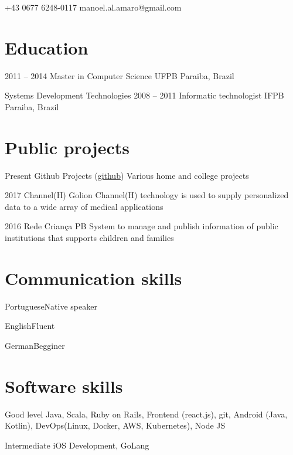\documentclass{tccv}
\begin{document}
    {+43 0677 6248-0117}
    {manoel.al.amaro@gmail.com}

\section{Education}

\begin{yearlist}

\item{2011 -- 2014}
     {Master in Computer Science}
     {UFPB Paraiba, Brazil}

\item[Systems Development Technologies]{2008 -- 2011}
     {Informatic technologist}
     {IFPB Paraiba, Brazil}

\end{yearlist}

\section{Public projects}

\begin{yearlist}

\item{Present}
     {Github Projects (\href{https://github.com/manoamaro}{github})}
     {Various home and college projects}

\item{2017}
     {Channel(H) Golion}
     {Channel(H) technology is used to supply personalized data to a wide array of medical applications}

\item{2016}
     {Rede Criança PB}
     {System to manage and publish information of public institutions that supports children and families}

\end{yearlist}

\section{Communication skills}

\begin{factlist}
\item{Portuguese}{Native speaker}
\item{English}{Fluent}
\item{German}{Begginer}
\end{factlist}

\section{Software skills}

\begin{factlist}

\item{Good level}
     {Java, Scala, Ruby on Rails, Frontend (react.js), git, Android (Java, Kotlin), DevOps(Linux, Docker, AWS, Kubernetes), Node JS}

\item{Intermediate}
     {iOS Development, GoLang}

\end{factlist}
\end{document}
